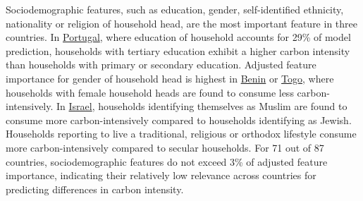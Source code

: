 \documentclass[12pt, a4paper]{article}
\begin{document}
Sociodemographic features, such as education, gender, self-identified ethnicity, nationality or religion of household head, are the most important feature in three countries. In \hyperref[fig:5b_PRT]{Portugal}, where education of household accounts for 29\% of model prediction, households with tertiary education exhibit a higher carbon intensity than households with primary or secondary education. Adjusted feature importance for gender of household head is highest in \hyperref[fig:5b_BEN]{Benin} or \hyperref[fig:5b_TGO]{Togo}, where households with female household heads are found to consume less carbon-intensively. In \hyperref[fig:5b_ISR]{Israel}, households identifying themselves as Muslim are found to consume more carbon-intensively compared to households identifying as Jewish. Households reporting to live a traditional, religious or orthodox lifestyle consume more carbon-intensively compared to secular households. For 71 out of 87 countries, sociodemographic features do not exceed 3\% of adjusted feature importance, indicating their relatively low relevance across countries for predicting differences in carbon intensity.
\end{document}

